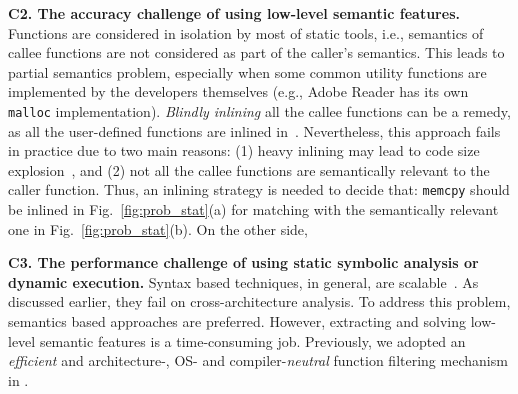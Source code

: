 \noindent\textbf{C2. The accuracy challenge of using low-level semantic features.} %
Functions are considered in isolation by most of static tools, i.e., semantics of callee functions are not considered as part of the caller's semantics. This leads to partial semantics problem, especially when some common utility functions are implemented by the developers themselves (e.g., Adobe Reader has its own \texttt{malloc} implementation).
\textit{Blindly inlining}  all the callee functions can be a remedy, as  all the user-defined functions are inlined in~\cite{wang2015binary}. %
 Nevertheless, this approach fails in practice due to two main reasons: (1) heavy inlining may lead to code size explosion~\cite{chang1992profile},  %
and (2) not all the callee functions are semantically relevant to the caller function. %
Thus, an inlining strategy is needed to decide that: \texttt{memcpy} should be inlined in Fig.~\ref{fig:prob_stat}(a) for matching with the semantically relevant one in Fig.~\ref{fig:prob_stat}(b). On the other side, 


\noindent\textbf{C3. The performance challenge of using static symbolic analysis or dynamic execution.} %
 Syntax based techniques, in general, are scalable~\cite{DBLP:conf/pldi/DavidY14}. As discussed earlier, they fail on cross-architecture analysis. To address this problem, semantics based approaches are preferred. However, extracting and solving low-level semantic features is a time-consuming job. Previously, we adopted an \emph{efficient} and architecture-, OS- and compiler-\emph{neutral} function filtering mechanism in \cite{bingo}. 

